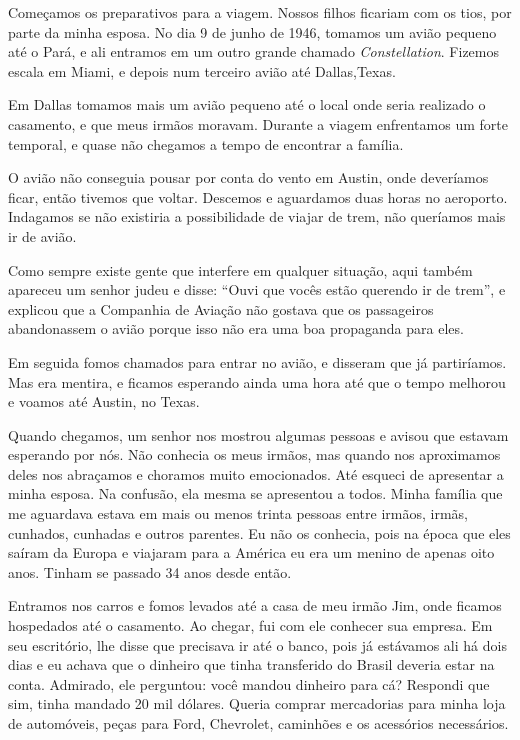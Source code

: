 Começamos os preparativos para a viagem. Nossos filhos ficariam com
os tios, por parte da minha esposa. No dia 9 de junho de 1946, tomamos um avião pequeno até o Pará, e ali entramos em um outro grande chamado \textit{Constellation}. Fizemos escala em Miami, e depois num terceiro avião até Dallas,Texas.

Em Dallas tomamos mais um avião pequeno até o local onde seria
realizado o casamento, e que meus irmãos moravam. Durante a viagem
enfrentamos um forte temporal, e quase não chegamos a tempo de encontrar a
família.

O avião não conseguia pousar por conta do vento em Austin, onde
deveríamos ficar, então tivemos que voltar. Descemos e aguardamos duas
horas no aeroporto. Indagamos se não existiria a possibilidade
de viajar de trem, não queríamos mais ir de avião. 

Como sempre existe gente que interfere em qualquer situação, aqui também
apareceu um senhor judeu e disse: ``Ouvi que vocês estão querendo ir de
trem'', e explicou que a Companhia de Aviação não gostava que os
passageiros abandonassem o avião porque isso não era uma boa propaganda
para eles.

Em seguida fomos chamados para entrar no avião, e disseram que já
partiríamos. Mas era mentira, e ficamos esperando ainda uma hora até que o
tempo melhorou e voamos até Austin, no Texas.

Quando chegamos, um senhor nos mostrou algumas pessoas
e avisou que estavam esperando por nós. Não conhecia os meus irmãos, mas
quando nos aproximamos deles nos abraçamos e choramos muito emocionados. 
Até esqueci de apresentar a minha esposa. Na confusão, ela mesma se
apresentou a todos. Minha família que me aguardava estava em 
mais ou menos trinta pessoas entre irmãos, irmãs, cunhados, cunhadas e
outros parentes. Eu não os conhecia, pois na época que eles saíram da
Europa e viajaram para a América eu era um menino de apenas oito anos.
Tinham se passado 34 anos desde então.

Entramos nos carros e fomos levados até a casa de meu irmão Jim,
onde ficamos hospedados até o casamento. Ao chegar, fui com ele conhecer
sua empresa. Em seu escritório, lhe disse que
precisava ir até o banco, pois já estávamos ali há dois dias e eu achava
que o dinheiro que tinha transferido do Brasil deveria estar na conta.
Admirado, ele perguntou: você mandou dinheiro para cá? Respondi que sim,
tinha mandado 20 mil dólares. Queria comprar mercadorias para minha
loja de automóveis, peças para Ford, Chevrolet, caminhões 
e os acessórios necessários.

